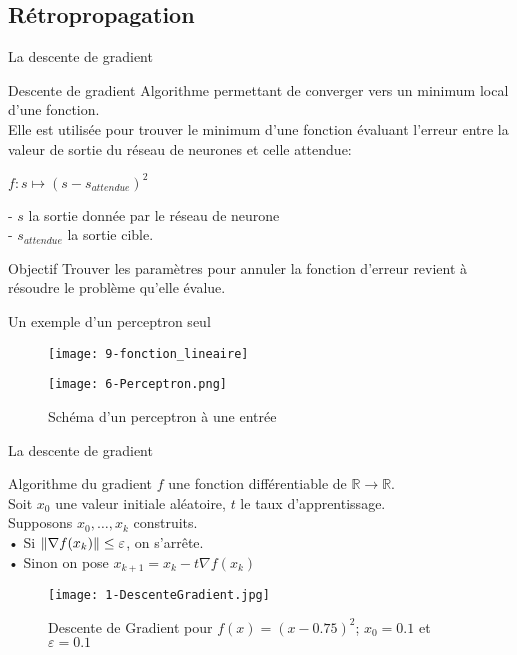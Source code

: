 \subsection{Rétropropagation}

\begin{frame}{La descente de gradient}
    \begin{block}{Descente de gradient}
        Algorithme permettant de converger vers un minimum local d'une fonction. \\
        Elle est utilisée pour trouver le minimum d'une fonction évaluant l'erreur entre la valeur de sortie du réseau de neurones et celle attendue: \\
        \begin{center}
            $f : s \mapsto (s - s_{attendue})^2$\\
        \end{center}
        - $s$ la sortie donnée par le réseau de neurone \\
        - $s_{attendue}$ la sortie cible. \\

    \end{block}
    \begin{exampleblock}{Objectif}
        Trouver les paramètres pour annuler la fonction d'erreur revient à résoudre le problème qu'elle évalue.
    \end{exampleblock}
\end{frame}


\begin{frame}{Un exemple d'un perceptron seul}
    \begin{figure}
        \centering
        \texttt{[image: 9-fonction\_lineaire]}
    \end{figure}
    \begin{figure}
        \centering
        \texttt{[image: 6-Perceptron.png]}
        \caption{Schéma d'un perceptron à une entrée}
    \end{figure}
\end{frame}


\begin{frame}{La descente de gradient}
    \begin{block}{Algorithme du gradient}
        $f$ une fonction différentiable de $\mathbb{R} \to \mathbb{R}$. \\
        Soit $x_0$ une valeur initiale aléatoire, $t$ le taux d'apprentissage. \\
        Supposons $x_0, \ldots, x_k$ construits. \\
        • Si $\| \nabla f(x_k) \| \leq \varepsilon$, on s'arrête. \\
        • Sinon on pose $x_{k+1} = x_k - t \nabla f(x_k)$ \\
    \end{block}
    \begin{figure}
        \centering
        \texttt{[image: 1-DescenteGradient.jpg]}
        \caption{Descente de Gradient pour $f(x) = (x-0.75)^2$; $x_0=0.1$ et $\varepsilon = 0.1$}
    \end{figure}
\end{frame}


